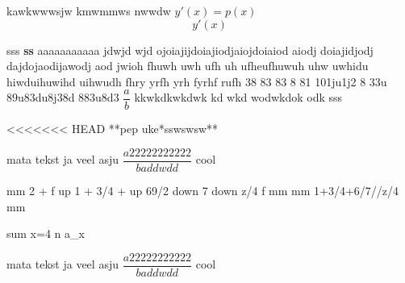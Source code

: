 \documentclass{article}
\begin{document}
kawkwwwsjw kmwmmws nwwdw $y'(x) = p(x) $ 
\[ y'(x) \] 

sss 
\textbf{ss} 
aaaaaaaaaaa jdwjd wjd ojoiajijdoiajiodjaiojdoiaiod aiodj doiajidjodj dajdojaodijawodj aod jwioh fhuwh uwh ufh uh ufheufhuwuh uhw uwhidu hiwduihuwihd uihwudh fhry yrfh yrh fyrhf rufh 38 83 83 8 81 101ju1j2 8 33u 89u83du8j38d 883u8d3 $\dfrac{a}{b} $ kkwkdkwkdwk kd wkd wodwkdok odk sss 

<<<<<<< HEAD
**pep uke*sswswsw** 

mata tekst ja veel asju $\dfrac{a22222222222}{baddwdd} $ cool 

mm 2 + f up 1 + 3/4 + up 69/2 down 7 down z/4 f  mm 
mm 1+3/4+6/7//z/4 mm 

sum x=4 n a_x 

mata tekst ja veel asju $\dfrac{a22222222222}{baddwdd} $ cool 
\end{document}
